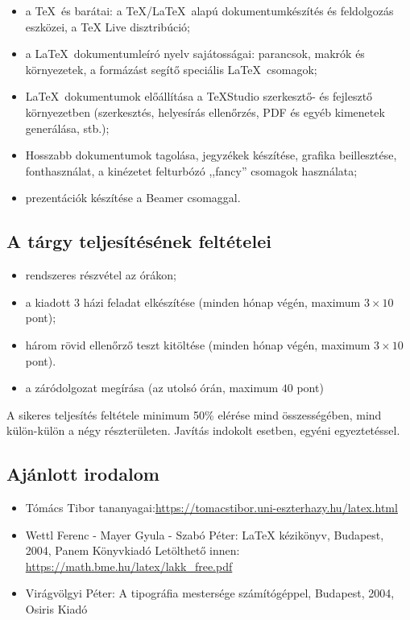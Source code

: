 \documentclass{article}
\begin{document}
\begin{itemize}
	\item a \TeX\  és barátai: a \TeX/\LaTeX\  alapú dokumentumkészítés és feldolgozás eszközei, a
	 TeX Live  disztribúció;%
	\item a \LaTeX\ dokumentumleíró nyelv sajátosságai: parancsok, makrók és környezetek, a formázást segítő speciális \LaTeX\  csomagok;%
 	\item  \LaTeX\  dokumentumok előállítása a TeXStudio szerkesztő- és fejlesztő környezetben
	(szerkesztés, helyesírás ellenőrzés, PDF és egyéb kimenetek generálása, stb.);%
	\item Hosszabb dokumentumok tagolása, jegyzékek készítése, grafika beillesztése, fonthasználat, a kinézetet felturbózó ,,fancy'' csomagok használata;%
	\item prezentációk készítése a Beamer csomaggal.%
\end{itemize}	

\subsection*{A tárgy teljesítésének feltételei}
 
\begin{itemize} 
	\item rendszeres részvétel az órákon;
	\item a kiadott 3 házi feladat elkészítése (minden hónap végén, maximum $3\times 10$ pont);
	\item három rövid ellenőrző teszt kitöltése (minden hónap végén, maximum $3\times 10$ pont).
	\item a záródolgozat megírása (az utolsó órán, maximum $40$ pont)
\end{itemize}
A sikeres teljesítés feltétele minimum 50\% elérése mind összességében, mind külön-külön a négy részterületen. Javítás indokolt esetben, egyéni egyeztetéssel.

\subsection*{Ajánlott irodalom}

 \begin{itemize}
 	\item Tómács Tibor tananyagai:\newline \url{https://tomacstibor.uni-eszterhazy.hu/latex.html}
 	\item Wettl Ferenc - Mayer Gyula - Szabó Péter:  LaTeX kézikönyv, Budapest, 2004, Panem Könyvkiadó\newline
 	 Letölthető innen: \url{https://math.bme.hu/latex/lakk_free.pdf}
    \item Virágvölgyi Péter:  A tipográfia mestersége számítógéppel, Budapest, 2004, Osiris Kiadó 
\end{itemize}
\end{document}
